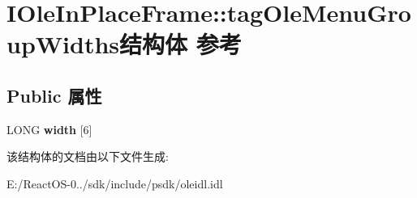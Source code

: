 \hypertarget{struct_i_ole_in_place_frame_1_1tag_ole_menu_group_widths}{}\section{I\+Ole\+In\+Place\+Frame\+:\+:tag\+Ole\+Menu\+Group\+Widths结构体 参考}
\label{struct_i_ole_in_place_frame_1_1tag_ole_menu_group_widths}
\subsection*{Public 属性}
\begin{DoxyCompactItemize}
\item 
\mbox{\label{struct_i_ole_in_place_frame_1_1tag_ole_menu_group_widths_a53c05087c67a41256908a972d7baac95}} 
L\+O\+NG {\bfseries width} \mbox{[}6\mbox{]}
\end{DoxyCompactItemize}


该结构体的文档由以下文件生成\+:\begin{DoxyCompactItemize}
\item 
E\+:/\+React\+O\+S-\/0../sdk/include/psdk/oleidl.\+idl\end{DoxyCompactItemize}
